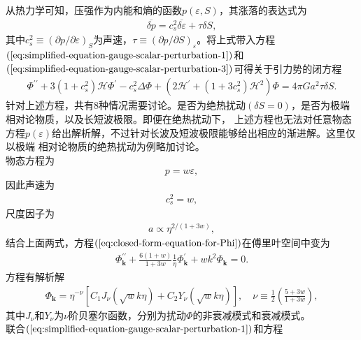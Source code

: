 从热力学可知，压强作为内能和熵的函数$p(\varepsilon, S)$，其涨落的表达式为
\begin{align}
  \label{eq:perturbation-of-pressure}
  \overline{\delta
  p}=c^2_{s}\overline{\delta\varepsilon}+\tau\delta S,
\end{align}
其中$c^2_{s}\equiv {\left(\partial p /\partial
\varepsilon\right)}_{S}$为声速，$\tau\equiv{\left(\partial p /\partial
S\right)}_{\varepsilon}$。将上式带入方程$(\ref{eq:simplified-equation-gauge-scalar-perturbation-1})$和$(\ref{eq:simplified-equation-gauge-scalar-perturbation-3})$可得关于引力势的闭方程
\begin{align}
  \label{eq:closed-form-equation-for-Phi}
  \Phi^{\prime\prime}+3{\left(1+c^2_{s}\right)}\mathcal{H}\Phi^\prime-c^2_{s}\Delta\Phi+{\left(2\mathcal{H}^{\prime}+
  {\left(1+3c^2_{s}\right)}\mathcal{H}^2\right)}\Phi=4\pi Ga^2\tau\delta S.
\end{align}
针对上述方程，共有8种情况需要讨论。是否为绝热扰动${\left(\delta
S=0\right)}$，是否为极端相对论物质，以及长短波极限。即便在绝热扰动下，
上述方程也无法对任意物态方程$p(\varepsilon)$给出解析解，不过针对长波及短波极限能够给出相应的渐进解。这里仅以极端
相对论物质的绝热扰动为例略加讨论。
\\
物态方程为
\begin{align}
  p=w\varepsilon,
\end{align}
因此声速为
\begin{align}
  c^2_{s}=w,
\end{align}
尺度因子为
\begin{align}
  a\propto\eta^{2 /(1+3w)},
\end{align}
结合上面两式，方程$(\ref{eq:closed-form-equation-for-Phi})$在傅里叶空间中变为
\begin{align}
  \label{eq:adiabatic-relativistic-equation-of-Phi}
  \Phi^{\prime\prime}_{\mathbf{k}}+\frac{6(1+w)}{1+3w}\frac{1}{\eta}\Phi^\prime_{\mathbf{k}}+wk^2\Phi_{\mathbf{k}}=0.
\end{align}
方程有解析解
\begin{align}
  \label{eq:solution-for-adiabatic-relativistic-equation-of-Phi}
  \Phi_{\mathbf{k}}=\eta^{-\nu}{\left[
  C_1J_{\nu}{\left(\sqrt{w}k\eta\right)}+C_2Y_{\nu}{\left(\sqrt{w}k\eta\right)}
  \right]},\quad
  \nu\equiv \frac{1}{2}{\left(\frac{5+3w}{1+3w}\right)},
\end{align}
其中$J_{\nu}$和$Y_{\nu}$为$\nu$阶贝塞尔函数，分别为扰动$\Phi$的非衰减模式和衰减模式。\\
联合$(\ref{eq:simplified-equation-gauge-scalar-perturbation-1})$和方程
